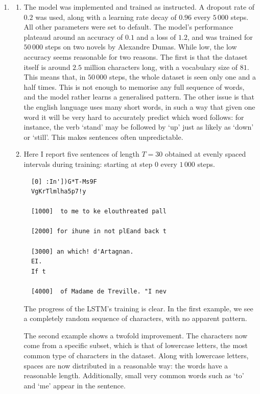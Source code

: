 \documentclass{article}
\begin{document}
\begin{enumerate}[label=\textbf{2.\arabic*}]
  \item

  \begin{enumerate}[label=\textbf{(\alph*)}]
    \item
    The model was implemented and trained as instructed. A dropout rate of $0.2$ was used, along with a learning rate decay of $0.96$ every $5\,000$ steps. All other parameters were set to default. The model's performance plateaud around an accuracy of $0.1$ and a loss of $1.2$, and was trained for $50\,000$ steps on two novels by Alexandre Dumas. While low, the low accuracy seems reasonable for two reasons. The first is that the dataset itself is around $2.5$ million characters long, with a vocabulary size of $81$. This means that, in $50\,000$ steps, the whole dataset is seen only one and a half times. This is not enough to memorise any full sequence of words, and the model rather learns a generalised pattern. The other issue is that the english language uses many short words, in such a way that given one word it will be very hard to accurately predict which word follows: for instance, the verb `stand' may be followed by `up' just as likely as `down' or `still'. This makes sentences often unpredictable.

    \item
    Here I report five sentences of length $T = 30$ obtained at evenly spaced intervals during training: starting at step $0$ every $1\,000$ steps.
    \begin{lstlisting}
  [0] :In'])G*T-Ms9F
  VgKrTlmlha5p7!y

  [1000]  to me to ke elouthreated pall

  [2000] for ihune in not plEand back t

  [3000] an which! d'Artagnan.
  EI.
  If t

  [4000]  of Madame de Treville. "I nev
    \end{lstlisting}

    The progress of the LSTM's training is clear. In the first example, we see a completely random sequence of characters, with no apparent pattern.

    The second example shows a twofold improvement. The characters now come from a specific subset, which is that of lowercase letters, the most common type of characters in the dataset. Along with lowercase letters, spaces are now distributed in a reasonable way: the words have a reasonable length. Additionally, small very common words such as `to' and `me' appear in the sentence.


\end{enumerate}
\end{enumerate}
\end{document}
